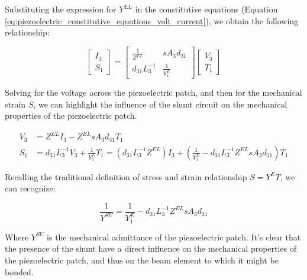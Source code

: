 

Substituting the expression for $Y^{EL}$ in the constitutive equations (Equation \ref{eq:piezoelectric_constitutive_equations_volt_current}), we obtain the following relationship:

\begin{equation}
    \begin{bmatrix}
        I_3 \\
        S_1
    \end{bmatrix} =
    \begin{bmatrix}
        \frac{1}{Z^{EL}} & sA_3 d_{31}     \\
        d_{31} L_3^{-1}  & \frac{1}{Y_1^E}
    \end{bmatrix}
    \begin{bmatrix}
        V_3 \\
        T_1
    \end{bmatrix}
\end{equation}

Solving for the voltage across the piezoelectric patch, and then for the mechanical strain $S$, we can highlight the influence of the shunt circuit on the mechanical properties of the piezoelectric patch.

\begin{equation}
    \begin{aligned}
        V_3 & = Z^{EL} I_3 - Z^{EL} sA_3 d_{31} T_1                                                                                                                             \\
        S_1 & = d_{31} L_3^{-1} V_3 + \frac{1}{Y_1^E} T_1 = \left( d_{31} L_3^{-1} Z^{EL} \right) I_3 + \left( \frac{1}{Y_1^E} - d_{31} L_3^{-1} Z^{EL} sA_3 d_{31} \right) T_1
    \end{aligned}
\end{equation}

Recalling the traditional definition of stress and strain relationship $S = Y^E T$, we can recognize:

\begin{equation}
    \frac{1}{Y^{SU}} = \frac{1}{Y_1^E} - d_{31} L_3^{-1} Z^{EL} sA_3 d_{31}
\end{equation}

Where $Y^{SU}$ is the mechanical admittance of the piezoelectric patch.
It's clear that the presence of the shunt have a direct influence on the mechanical properties of the piezoelectric patch, and thus on the beam element to which it might be bonded.

